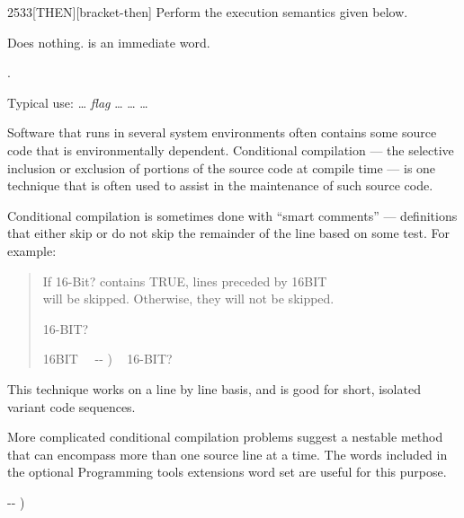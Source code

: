 \begin{worddef}{2533}{[THEN]}[bracket-then]
\compile
	Perform the execution semantics given below.

\execute
	\stack{}{}

	Does nothing. \word{[THEN]} is an immediate word.

\see {}.

	\begin{rationale} %
		Typical use:
			{\ldots} \emph{flag}
			\word[tools]{[IF]} {\ldots}
			\word[tools]{[ELSE]} {\ldots}
			\word[tools]{[THEN]} {\ldots}

		Software that runs in several system environments often
		contains some source code that is environmentally dependent.
		Conditional compilation --- the selective inclusion or
		exclusion of portions of the source code at compile time ---
		is one technique that is often used to assist in the
		maintenance of such source code.

		Conditional compilation is sometimes done with ``smart
		comments'' --- definitions that either skip or do not skip
		the remainder of the line based on some test. For example:

		\begin{quote}\ttfamily
			 If 16-Bit? contains TRUE, lines preceded by 16BIT\bs \\
			 will be skipped. Otherwise, they will not be skipped.

			 16-BIT?

			\word{:} 16BIT\bs~~ -{}- ) ~
				16-BIT?  ~
				 ~   ~  \\
			\word{;} 
		\end{quote}

		This technique works on a line by line basis, and is good for
		short, isolated variant code sequences.

		More complicated conditional compilation problems suggest a
		nestable method that can encompass more than one source line
		at a time. The words included in the optional Programming tools
		extensions word set are useful for this purpose.
	\end{rationale}

	\begin{implement} %
		\word{:} \word{[THEN]}  -{}- ) \word{;} 
	\end{implement}


\end{worddef}
